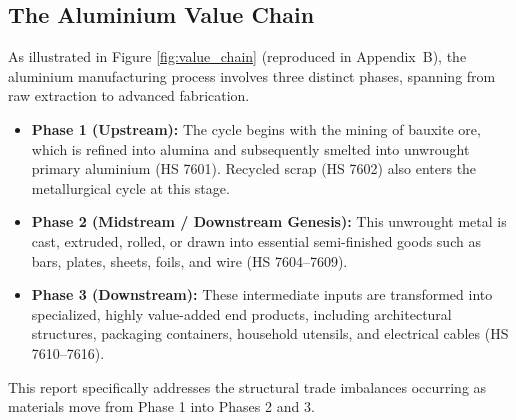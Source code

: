 \documentclass[11pt, a4paper]{article}
\numberwithin{figure}{section}
\numberwithin{table}{section}
\begin{document}
\subsection{The Aluminium Value Chain}
As illustrated in Figure \ref{fig:value_chain} (reproduced in Appendix~B), the aluminium manufacturing process involves three distinct phases, spanning from raw extraction to advanced fabrication.

\begin{itemize}
    \item \textbf{Phase 1 (Upstream):} The cycle begins with the mining of bauxite ore, which is refined into alumina and subsequently smelted into unwrought primary aluminium (HS 7601). Recycled scrap (HS 7602) also enters the metallurgical cycle at this stage.
    \item \textbf{Phase 2 (Midstream / Downstream Genesis):} This unwrought metal is cast, extruded, rolled, or drawn into essential semi-finished goods such as bars, plates, sheets, foils, and wire (HS 7604--7609).
    \item \textbf{Phase 3 (Downstream):} These intermediate inputs are transformed into specialized, highly value-added end products, including architectural structures, packaging containers, household utensils, and electrical cables (HS 7610--7616).
\end{itemize}
This report specifically addresses the structural trade imbalances occurring as materials move from Phase 1 into Phases 2 and 3.
\end{document}
